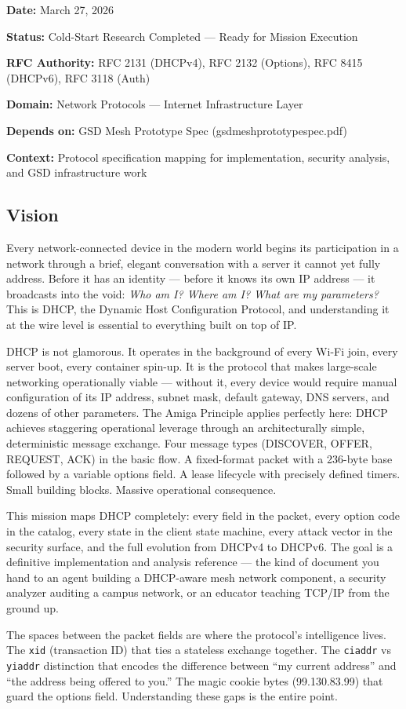 \documentclass[11pt,letterpaper]{article}
\newcommand{\metafield}[2]{\textbf{\sffamily #1} #2\par}
\begin{document}
\metafield{Date:}{March 27, 2026}
\metafield{Status:}{Cold-Start Research Completed --- Ready for Mission Execution}
\metafield{RFC Authority:}{RFC 2131 (DHCPv4), RFC 2132 (Options), RFC 8415 (DHCPv6), RFC 3118 (Auth)}
\metafield{Domain:}{Network Protocols --- Internet Infrastructure Layer}
\metafield{Depends on:}{GSD Mesh Prototype Spec (gsdmeshprototypespec.pdf)}
\metafield{Context:}{Protocol specification mapping for implementation, security analysis, and GSD infrastructure work}

\subsection{Vision}

Every network-connected device in the modern world begins its participation in a network through a brief, elegant conversation with a server it cannot yet fully address. Before it has an identity --- before it knows its own IP address --- it broadcasts into the void: \textit{Who am I? Where am I? What are my parameters?} This is DHCP, the Dynamic Host Configuration Protocol, and understanding it at the wire level is essential to everything built on top of IP.

DHCP is not glamorous. It operates in the background of every Wi-Fi join, every server boot, every container spin-up. It is the protocol that makes large-scale networking operationally viable --- without it, every device would require manual configuration of its IP address, subnet mask, default gateway, DNS servers, and dozens of other parameters. The Amiga Principle applies perfectly here: DHCP achieves staggering operational leverage through an architecturally simple, deterministic message exchange. Four message types (DISCOVER, OFFER, REQUEST, ACK) in the basic flow. A fixed-format packet with a 236-byte base followed by a variable options field. A lease lifecycle with precisely defined timers. Small building blocks. Massive operational consequence.

This mission maps DHCP completely: every field in the packet, every option code in the catalog, every state in the client state machine, every attack vector in the security surface, and the full evolution from DHCPv4 to DHCPv6. The goal is a definitive implementation and analysis reference --- the kind of document you hand to an agent building a DHCP-aware mesh network component, a security analyzer auditing a campus network, or an educator teaching TCP/IP from the ground up.

The spaces between the packet fields are where the protocol's intelligence lives. The \texttt{xid} (transaction ID) that ties a stateless exchange together. The \texttt{ciaddr} vs \texttt{yiaddr} distinction that encodes the difference between ``my current address'' and ``the address being offered to you.'' The magic cookie bytes (99.130.83.99) that guard the options field. Understanding these gaps is the entire point.
\end{document}
